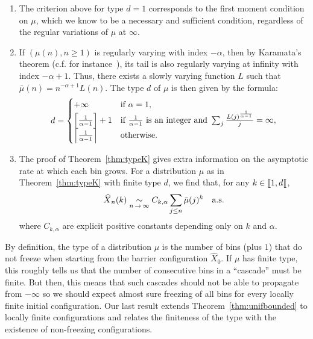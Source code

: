 \documentclass[AHL,Unicode,longabstracts,published]{cedram}
\let\originalleft\left
\let\originalright\right
\renewcommand{\left}{\mathopen{}\mathclose\bgroup\originalleft}
\renewcommand{\right}{\aftergroup\egroup\originalright}
\let\oldin\in
\renewcommand{\in}{\mathchoice{\oldin}{\oldin}{\,\oldin\,}{\,\oldin\,}}
\renewcommand*{\to}{\mathchoice{\longrightarrow}{\rightarrow}{\rightarrow}{\rightarrow}}
\let\oldhat\hat
\renewcommand*{\hat}[1]{\mathchoice{\widehat{#1}}{\widehat{#1}}{\oldhat{#1}}{\oldhat{#1}}}
\newcommand{\llbracket}{\mathopen{[\mkern -2.7mu[}}
\newcommand{\llbracketclose}{\mathclose{[\mkern -2.7mu[}}
\newcommand{\llb}{\llbracket}
\begin{document}
\begin{rema}\leavevmode
\begin{enumerate}
\item\label{rema1.8.1} The criterion above for type $d=1$ corresponds to the first moment condition on $\mu$, which we know to be a necessary and sufficient condition, regardless of the regular variations of $\mu$ at $\infty$.
\item\label{rema1.8.2} If $(\mu(n), n\geq 1)$ is regularly varying with index $-\alpha$, then by Karamata's theorem (c.f. for instance~\cite[Chapter~VIII.9]{Feller71}), its tail is also regularly varying at infinity with index $-\alpha + 1$. Thus, there exists a slowly varying function $L$ such that $\bar{\mu}(n) = n^{-\alpha + 1} L(n)$. The type $d$ of $\mu$ is then given by the formula:
\[
d =
\begin{cases}
+\infty & \text{if }\alpha = 1,\\
\left\lceil \frac{1}{\alpha - 1} \right\rceil + 1 & \text{if }\frac{1}{\alpha- 1}\text{ is an integer and }\sum_j \frac{L(j)^{\frac{1}{\alpha- 1}}}{j} = \infty,\\[0.2em]
\left\lceil \frac{1}{\alpha - 1} \right\rceil & \text{otherwise.}
\end{cases}
\]
\item The proof of Theorem~\ref{thm:typeK} gives extra information on the asymptotic rate at which each bin grows. For a distribution $\mu$ as in Theorem~\ref{thm:typeK} with finite type $d$, we find that, for any $k \in \llb 1, d \llbracketclose$,
\[
\hat{X}_n(k) \underset{n\,\to\,\infty}{\sim} C_{k,\alpha} \sum_{j \leq n} \bar{\mu}(j)^k \quad \text{a.s.}
\]
where $C_{k,\alpha}$ are explicit positive constants depending only on $k$ and $\alpha$.
\end{enumerate}
\end{rema}

By definition, the type of a distribution $\mu$ is the number of bins (plus $1$) that do not freeze when starting from the barrier configuration $\widehat{X}_0$. If $\mu$ has finite type, this roughly tells us that the number of consecutive bins in a ``cascade'' must be finite. But then, this means that such cascades should not be able to propagate from $-\infty$ so we should expect almost sure freezing of all bins for every locally finite initial configuration. Our last result extends Theorem~\ref{thm:unifbounded} to locally finite configurations and relates the finiteness of the type with the existence of non-freezing configurations.
\end{document}
